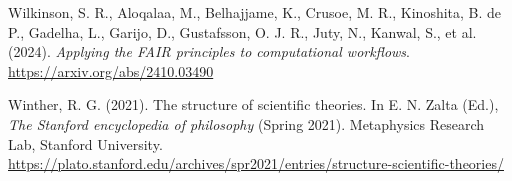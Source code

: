 \documentclass[man]{apa7}
\newlength{\cslhangindent}
\newenvironment{CSLReferences}[2] %
 {\begin{list}{}{%
  \setlength{\itemindent}{0pt}
  \setlength{\leftmargin}{0pt}
  \setlength{\parsep}{0pt}
  \ifodd #1
   \setlength{\leftmargin}{\cslhangindent}
   \setlength{\itemindent}{-1\cslhangindent}
  \fi
  \setlength{\itemsep}{#2\baselineskip}}}
 {\end{list}}
\begin{document}
\begin{CSLReferences}{1}{0}
Wilkinson, S. R., Aloqalaa, M., Belhajjame, K., Crusoe, M. R., Kinoshita, B. de P., Gadelha, L., Garijo, D., Gustafsson, O. J. R., Juty, N., Kanwal, S., et al. (2024). \emph{Applying the {FAIR} principles to computational workflows}. \url{https://arxiv.org/abs/2410.03490}

Winther, R. G. (2021). The structure of scientific theories. In E. N. Zalta (Ed.), \emph{The {Stanford} encyclopedia of philosophy} (Spring 2021). Metaphysics Research Lab, Stanford University. \url{https://plato.stanford.edu/archives/spr2021/entries/structure-scientific-theories/}

\end{CSLReferences}


\clearpage
\renewcommand{\listfigurename}{Figure captions}

\clearpage
\renewcommand{\listtablename}{Table captions}
\end{document}
